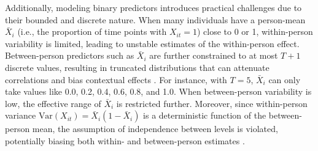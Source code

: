 \documentclass[stu]{apa7}
\begin{document}

Additionally, modeling binary predictors introduces practical challenges due to their bounded and discrete nature. When many individuals have a person-mean $\bar{X}_i$ (i.e., the proportion of time points with $X_{it} = 1$) close to 0 or 1, within-person variability is limited, leading to unstable estimates of the within-person effect. Between-person predictors such as $\bar{X}_i$ are further constrained to at most $T + 1$ discrete values, resulting in truncated distributions that can attenuate correlations and bias contextual effects \parencite[]{asparouhov_latent_2019}. For instance, with $T = 5$, $\bar{X}_i$ can only take values like 0.0, 0.2, 0.4, 0.6, 0.8, and 1.0. When between-person variability is low, the effective range of $\bar{X}_i$ is restricted further. Moreover, since within-person variance $\text{Var}(X_{it}) = \bar{X}_i(1 - \bar{X}_i)$ is a deterministic function of the between-person mean, the assumption of independence between levels is violated, potentially biasing both within- and between-person estimates \parencite[]{asparouhov_latent_2019}.

\end{document}
